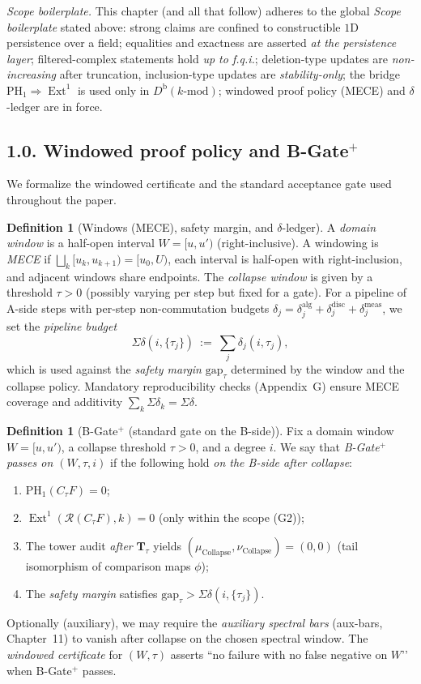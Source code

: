 \documentclass[11pt]{article}
\DeclareMathOperator{\Ext}{Ext}
\numberwithin{equation}{section}
\theoremstyle{definition}
\newtheorem{definition}[theorem]{Definition}
\begin{document}
\noindent\emph{Scope boilerplate.} This chapter (and all that follow) adheres to the global \emph{Scope boilerplate} stated above: strong claims are confined to constructible $1$D persistence over a field; equalities and exactness are asserted \emph{at the persistence layer}; filtered-complex statements hold \emph{up to f.q.i.}; deletion-type updates are \emph{non-increasing} after truncation, inclusion-type updates are \emph{stability-only}; the bridge $\mathrm{PH}_1\Rightarrow \Ext^1$ is used only in $D^{\mathrm{b}}(k\text{-mod})$; windowed proof policy (MECE) and $\delta$-ledger are in force.

\subsection*{1.0. Windowed proof policy and B-Gate$^{+}$}
We formalize the windowed certificate and the standard acceptance gate used throughout the paper.

\begin{definition}[Windows (MECE), safety margin, and $\delta$-ledger]\label{def:windows-delta}
A \emph{domain window} is a half-open interval $W=[u,u')$ (right-inclusive). A windowing is \emph{MECE} if $\bigsqcup_k [u_k,u_{k+1})=[u_0,U)$, each interval is half-open with right-inclusion, and adjacent windows share endpoints. The \emph{collapse window} is given by a threshold $\tau>0$ (possibly varying per step but fixed for a gate). For a pipeline of A-side steps with per-step non-commutation budgets $\delta_j=\delta^{\mathrm{alg}}_j+\delta^{\mathrm{disc}}_j+\delta^{\mathrm{meas}}_j$, we set the \emph{pipeline budget}
\[
\Sigma\delta(i,\{\tau_j\})\ :=\ \sum_j \delta_j(i,\tau_j),
\]
which is used against the \emph{safety margin} $\mathrm{gap}_\tau$ determined by the window and the collapse policy. Mandatory reproducibility checks (Appendix~G) ensure MECE coverage and additivity $\sum_k\Sigma\delta_k=\Sigma\delta$.
\end{definition}

\begin{definition}[B-Gate$^{+}$ (standard gate on the B-side)]\label{def:bgate-plus}
Fix a domain window $W=[u,u')$, a collapse threshold $\tau>0$, and a degree $i$.
We say that \emph{B-Gate$^{+}$ passes on $(W,\tau,i)$} if the following hold \emph{on the B-side after collapse}:
\begin{enumerate}
\item $\mathrm{PH}_1(C_\tau F)=0$;
\item $\Ext^1(\mathcal{R}(C_\tau F),k)=0$ (only within the scope (G2));
\item The tower audit \emph{after} $\mathbf{T}_\tau$ yields $(\mu_{\mathrm{Collapse}},\nu_{\mathrm{Collapse}})=(0,0)$ (tail isomorphism of comparison maps $\phi$);
\item The \emph{safety margin} satisfies $\mathrm{gap}_\tau>\Sigma\delta(i,\{\tau_j\})$.
\end{enumerate}
Optionally (auxiliary), we may require the \emph{auxiliary spectral bars} (aux-bars, Chapter~11) to vanish after collapse on the chosen spectral window. The \emph{windowed certificate} for $(W,\tau)$ asserts “no failure with no false negative on $W$’’ when B-Gate$^{+}$ passes.
\end{definition}
\end{document}
